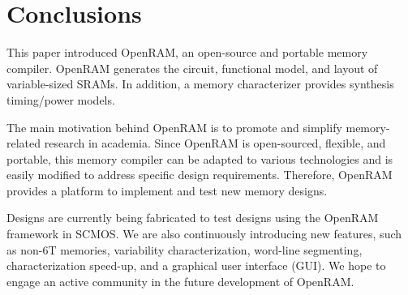 \section{Conclusions}
\label{sec:conclusions}
This paper introduced OpenRAM, an open-source and portable memory
compiler. OpenRAM generates the circuit, functional model, and layout
of variable-sized SRAMs. In addition, a memory characterizer
provides synthesis timing/power models.

The main motivation behind OpenRAM is to promote and simplify
memory-related research in academia. Since OpenRAM is open-sourced,
flexible, and portable, this memory compiler can be adapted to various
technologies and is easily modified to address specific design
requirements. Therefore, OpenRAM provides a platform to implement and test
new memory designs.

Designs are currently being fabricated to test designs using the
OpenRAM framework in SCMOS. We are also continuously introducing new
features, such as non-6T memories, variability characterization,
word-line segmenting, characterization speed-up, and a graphical user
interface (GUI). We hope to engage an active community in the future
development of OpenRAM.

